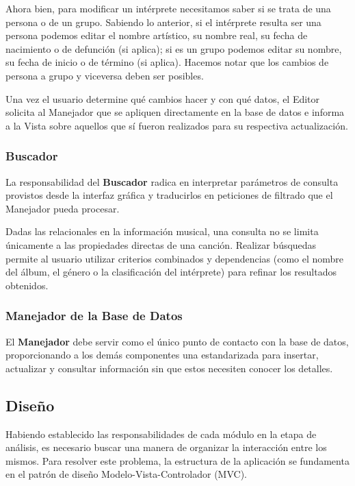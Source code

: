 \documentclass{rep}
\begin{document}
    Ahora bien, para modificar un intérprete necesitamos saber si se
    trata de una persona o de un grupo. Sabiendo lo anterior, si el
    intérprete resulta ser una persona podemos editar el nombre
    artístico, su nombre real, su fecha de nacimiento o de defunción
    (si aplica); si es un grupo podemos editar su nombre, su fecha de
    inicio o de término (si aplica). Hacemos notar que los cambios de
    persona a grupo y viceversa deben ser posibles. 

    Una vez el usuario determine qué cambios hacer y con qué datos, el
    Editor solicita al Manejador que se apliquen directamente en la
    base de datos e informa a la Vista sobre aquellos que sí fueron
    realizados para su respectiva actualización.
    
    \subsubsection{Buscador}

    La responsabilidad del \textbf{Buscador} radica en interpretar
    parámetros de consulta provistos desde la interfaz gráfica y
    traducirlos en peticiones de filtrado que el Manejador pueda
    procesar.

    Dadas las relacionales en la información musical, una consulta no
    se limita únicamente a las propiedades directas de una
    canción. Realizar búsquedas permite al usuario utilizar criterios
    combinados y dependencias (como el nombre del álbum, el género o
    la clasificación del intérprete) para refinar los resultados
    obtenidos.

    \subsubsection{Manejador de la Base de Datos}

    El \textbf{Manejador} debe servir como el único punto de contacto
    con la base de datos, proporcionando a los demás componentes una
    estandarizada para insertar, actualizar y consultar información
    sin que estos necesiten conocer los detalles. 

    \subsection{Diseño}

    Habiendo establecido las responsabilidades de cada módulo en la
    etapa de análisis, es necesario buscar una manera de organizar la
    interacción entre los mismos. Para resolver este problema, la
    estructura de la aplicación se fundamenta en el patrón de diseño
    Modelo-Vista-Controlador (MVC).
\end{document}
